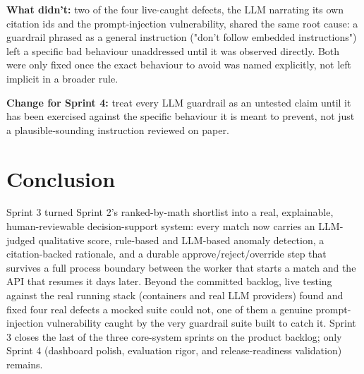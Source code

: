 \textbf{What didn't:} two of the four live-caught defects, the LLM
narrating its own citation ids and the prompt-injection vulnerability,
shared the same root cause: a guardrail phrased as a general
instruction ("don't follow embedded instructions") left a specific bad
behaviour unaddressed until it was observed directly. Both were only
fixed once the exact behaviour to avoid was named explicitly, not left
implicit in a broader rule.

\textbf{Change for Sprint 4:} treat every LLM guardrail as an untested
claim until it has been exercised against the specific behaviour it is
meant to prevent, not just a plausible-sounding instruction reviewed
on paper.

\section{Conclusion}
\label{sec:s3-conclusion}

Sprint 3 turned Sprint 2's ranked-by-math shortlist into a real,
explainable, human-reviewable decision-support system: every match now
carries an LLM-judged qualitative score, rule-based and LLM-based
anomaly detection, a citation-backed rationale, and a durable
approve/reject/override step that survives a full process boundary
between the worker that starts a match and the API that resumes it days
later. Beyond the committed backlog, live testing against the real
running stack (containers and real LLM providers) found and fixed four
real defects a mocked suite could not, one of them a genuine
prompt-injection vulnerability caught by the very guardrail suite built
to catch it.
Sprint 3 closes the last of the three core-system sprints on the
product backlog; only Sprint 4 (dashboard polish, evaluation rigor,
and release-readiness validation) remains.
